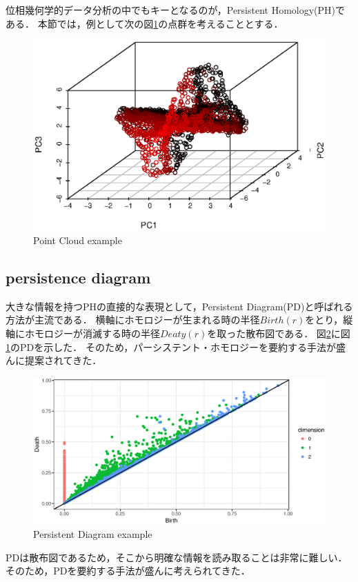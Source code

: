 \documentclass{jarticle}
\begin{document}
位相幾何学的データ分析の中でもキーとなるのが，Persistent Homology(PH)である．
本節では，例として次の図\ref{fig:PCex}の点群を考えることとする．
\begin{figure}[H]
	\begin{center}
		\includegraphics[width=15cm]{fig/PC_example.eps}
		\caption{Point Cloud example}
		\label{fig:PCex}
	\end{center}	
\end{figure}


\subsection{persistence diagram}
大きな情報を持つPHの直接的な表現として，Persistent Diagram(PD)と呼ばれる方法が主流である．
横軸にホモロジーが生まれる時の半径$Birth(r)$をとり，縦軸にホモロジーが消滅する時の半径$Deaty(r)$を取った散布図である．
図\ref{fig:PDex}に図\ref{fig:PCex}のPDを示した．
そのため，パーシステント・ホモロジーを要約する手法が盛んに提案されてきた．
\begin{figure}[H]
	\begin{center}
		\includegraphics[width=12cm]{fig/PD_example.eps}
		\caption{Persistent Diagram example}
		\label{fig:PDex}
	\end{center}
\end{figure}
PDは散布図であるため，そこから明確な情報を読み取ることは非常に難しい．
そのため，PDを要約する手法が盛んに考えられてきた．
\end{document}

